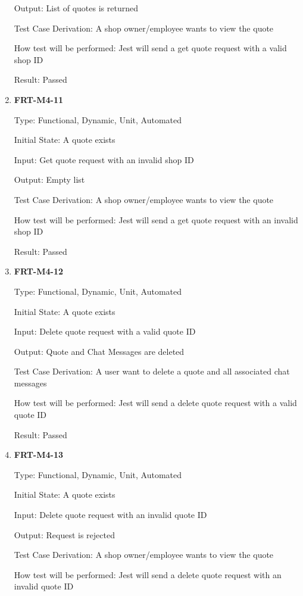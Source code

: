 \documentclass[12pt, titlepage]{article}
\begin{document}
\begin{enumerate}
	      Output: List of quotes is returned

	      Test Case Derivation: A shop owner/employee wants to view the quote

	      How test will be performed: Jest will send a get quote request with a valid shop ID

	      Result: Passed

	\item \textbf{FRT-M4-11}

	      Type: Functional, Dynamic, Unit, Automated

	      Initial State: A quote exists

	      Input: Get quote request with an invalid shop ID

	      Output: Empty list

	      Test Case Derivation: A shop owner/employee wants to view the quote

	      How test will be performed: Jest will send a get quote request with an invalid shop ID

	      Result: Passed

	\item \textbf{FRT-M4-12}

	      Type: Functional, Dynamic, Unit, Automated

	      Initial State: A quote exists

	      Input: Delete quote request with a valid quote ID

	      Output: Quote and Chat Messages are deleted

	      Test Case Derivation: A user want to delete a quote and all associated chat messages

	      How test will be performed: Jest will send a delete quote request with a valid quote ID

	      Result: Passed

	\item \textbf{FRT-M4-13}

	      Type: Functional, Dynamic, Unit, Automated

	      Initial State: A quote exists

	      Input: Delete quote request with an invalid quote ID

	      Output: Request is rejected

	      Test Case Derivation: A shop owner/employee wants to view the quote

	      How test will be performed: Jest will send a delete quote request with an invalid quote ID


\end{enumerate}
\end{document}
